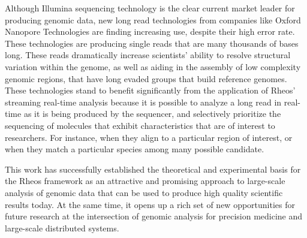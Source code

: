 Although Illumina sequencing technology is the clear current market leader for producing genomic data, new long read technologies from companies like Oxford Nanopore Technologies are finding increasing use, despite their high error rate\autocite{laver2015assessing}. These technologies are producing single reads that are many thousands of bases long. These reads dramatically increase scientists' ability to resolve structural variation within the genome\autocite{norris2016nanopore}, as well as aiding in the assembly of low complexity genomic regions, that have long evaded groups that build reference genomes\autocite{michael2018high}. These technologies stand to benefit significantly from the application of Rheos' streaming real-time analysis because it is possible to analyze a long read in real-time as it is being produced by the sequencer, and selectively prioritize the sequencing of molecules that exhibit characteristics that are of interest to researchers. For instance, when they align to a particular region of interest, or when they match a particular species among many possible candidate.

This work has successfully established the theoretical and experimental basis for the Rheos framework as an attractive and promising approach to large-scale analysis of genomic data that can be used to produce high quality scientific results today. At the same time, it opens up a rich set of new opportunities for future research at the intersection of genomic analysis for precision medicine and large-scale distributed systems.